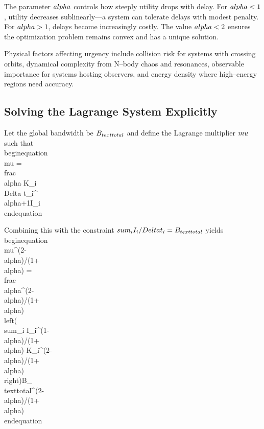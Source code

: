 \documentclass[twocolumn,prd,amsmath,amssymb,aps,superscriptaddress,nofootinbib]{revtex4-2}
\begin{document}
The parameter $\\alpha$ controls how steeply utility drops with delay. For $\\alpha < 1$, utility decreases sublinearly---a system can tolerate delays with modest penalty. For $\\alpha > 1$, delays become increasingly costly. The value $\\alpha < 2$ ensures the optimization problem remains convex and has a unique solution.

Physical factors affecting urgency include collision risk for systems with crossing orbits, dynamical complexity from N--body chaos and resonances, observable importance for systems hosting observers, and energy density where high--energy regions need accuracy.

\subsection{Solving the Lagrange System Explicitly}

Let the global bandwidth be $B_{\\text{total}}$ and define the Lagrange multiplier $\\mu$ such that
\\begin{equation}
\\mu = \\frac{\\alpha K_i \\Delta t_i^{\\alpha+1}}{I_i}
\\end{equation}

Combining this with the constraint $\\sum_i I_i / \\Delta t_i = B_{\\text{total}}$ yields
\\begin{equation}
\\mu^{(2-\\alpha)/(1+\\alpha)} = \\frac{\\alpha^{(2-\\alpha)/(1+\\alpha)} \\left( \\sum_i I_i^{(1-\\alpha)/(1+\\alpha)} K_i^{(2-\\alpha)/(1+\\alpha)} \\right)}{B_{\\text{total}}^{(2-\\alpha)/(1+\\alpha)}}
\\end{equation}
\end{document}
